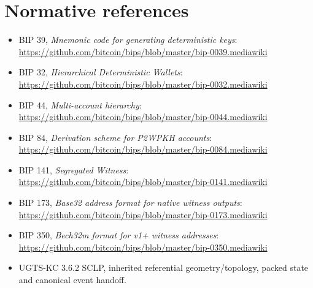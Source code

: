 \documentclass[10pt,a4paper]{article}
\begin{document}
\section*{Normative references}
\begin{itemize}
\item BIP 39, \emph{Mnemonic code for generating deterministic keys}: \url{https://github.com/bitcoin/bips/blob/master/bip-0039.mediawiki}
\item BIP 32, \emph{Hierarchical Deterministic Wallets}: \url{https://github.com/bitcoin/bips/blob/master/bip-0032.mediawiki}
\item BIP 44, \emph{Multi-account hierarchy}: \url{https://github.com/bitcoin/bips/blob/master/bip-0044.mediawiki}
\item BIP 84, \emph{Derivation scheme for P2WPKH accounts}: \url{https://github.com/bitcoin/bips/blob/master/bip-0084.mediawiki}
\item BIP 141, \emph{Segregated Witness}: \url{https://github.com/bitcoin/bips/blob/master/bip-0141.mediawiki}
\item BIP 173, \emph{Base32 address format for native witness outputs}: \url{https://github.com/bitcoin/bips/blob/master/bip-0173.mediawiki}
\item BIP 350, \emph{Bech32m format for v1+ witness addresses}: \url{https://github.com/bitcoin/bips/blob/master/bip-0350.mediawiki}
\item UGTS-KC 3.6.2 SCLP, inherited referential geometry/topology, packed state and canonical event handoff.
\end{itemize}
\end{document}
